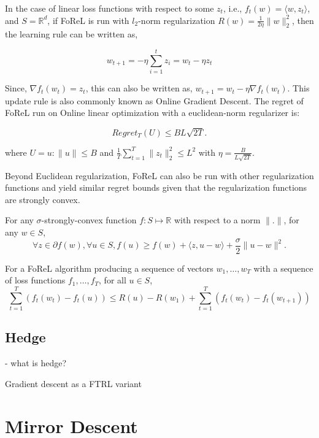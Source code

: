 In the case of linear loss functions with respect to some $z_t$, i.e., $f_t(w) = \langle w, z_t
	\rangle$, and $S=\mathbb{R}^d$, if FoReL is run with $l_2$-norm regularization $R(w) = \frac{1}{2
		\eta} \|w\|_2^2$, then the learning rule can be written as,

\begin{equation}
	w_{t+1} = -\eta \sum_{i=1}^t z_i = w_t - \eta z_t
\end{equation}

Since, $\nabla
	f_t(w_t) = z_t$, this can also be written as, $w_{t+1} = w_t - \eta \nabla f_t(w_t)$.
This update rule is also commonly known as Online Gradient Descent.
The regret of FoReL run on Online linear optimization with a euclidean-norm regularizer is:

$$Regret_T(U) \leq BL \sqrt {2T}.
$$

where $U = {u : \|u\| \leq B}$ and $\frac{1}{T} \sum_{t=1}^T \|z_t\|_2^2 \leq L^2$ with $\eta = \frac{B}{L\sqrt{2T}}$.

Beyond Euclidean regularization, FoReL can also be run with other regularization functions and
yield similar regret bounds given that the regularization functions are strongly convex.

\begin{definition}
	For any $\sigma$-strongly-convex function $f: S \mapsto \mathbb{R}$ with respect to a norm $\|.
		\|$, for any $w \in S$,
	\begin{equation}
		\forall z \in \partial f(w), \forall u \in S, f(u) \geq f(w) + \langle z, u - w\rangle + \frac{\sigma}{2}\| u - w \|^2.
	\end{equation}
\end{definition}

\begin{lemma}
	\label{lem:forelrb}
	For a FoReL algorithm producing a sequence of vectors $w_1, \ldots, w_T$ with a sequence of loss
	functions $f_1, \ldots, f_T$, for all $u \in S$, $$\sum_{t=1}^T (f_t(w_t) - f_t(u)) \leq R(u) -
		R(w_1) + \sum_{t=1}^T (f_t(w_t) - f_t(w_{t+1}))$$
\end{lemma}

\subsection{Hedge} - what is hedge?

Gradient descent as a FTRL variant

\section{Mirror Descent}

